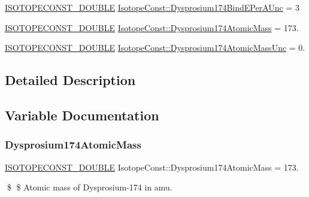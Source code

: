 \begin{DoxyCompactItemize}
\mbox{\hyperlink{group___isotope_const-_macros_ga8f45a7272ce02c0b4c65c44636ed719a}{I\+S\+O\+T\+O\+P\+E\+C\+O\+N\+S\+T\+\_\+\+D\+O\+U\+B\+LE}} \mbox{\hyperlink{group___isotope_const-_dysprosium-_dy174_ga437a1c4454ca5bb495819dc7f37ee754}{Isotope\+Const\+::\+Dysprosium174\+Bind\+E\+Per\+A\+Unc}} = 3
\item 
\mbox{\hyperlink{group___isotope_const-_macros_ga8f45a7272ce02c0b4c65c44636ed719a}{I\+S\+O\+T\+O\+P\+E\+C\+O\+N\+S\+T\+\_\+\+D\+O\+U\+B\+LE}} \mbox{\hyperlink{group___isotope_const-_dysprosium-_dy174_gaad1e92f03ab61709ef4eabfc6b90a978}{Isotope\+Const\+::\+Dysprosium174\+Atomic\+Mass}} = 173.
\item 
\mbox{\hyperlink{group___isotope_const-_macros_ga8f45a7272ce02c0b4c65c44636ed719a}{I\+S\+O\+T\+O\+P\+E\+C\+O\+N\+S\+T\+\_\+\+D\+O\+U\+B\+LE}} \mbox{\hyperlink{group___isotope_const-_dysprosium-_dy174_ga9c0c496436ec9e2d73db95ec7db4b5fb}{Isotope\+Const\+::\+Dysprosium174\+Atomic\+Mass\+Unc}} = 0.
\end{DoxyCompactItemize}


\subsection{Detailed Description}


\subsection{Variable Documentation}
\mbox{\label{group___isotope_const-_dysprosium-_dy174_gaad1e92f03ab61709ef4eabfc6b90a978}} 
\subsubsection{\texorpdfstring{Dysprosium174\+Atomic\+Mass}{Dysprosium174AtomicMass}}
{\footnotesize\ttfamily \mbox{\hyperlink{group___isotope_const-_macros_ga8f45a7272ce02c0b4c65c44636ed719a}{I\+S\+O\+T\+O\+P\+E\+C\+O\+N\+S\+T\+\_\+\+D\+O\+U\+B\+LE}} Isotope\+Const\+::\+Dysprosium174\+Atomic\+Mass = 173.}

\$ \$ Atomic mass of Dysprosium-\/174 in amu. \mbox{\label{group___isotope_const-_dysprosium-_dy174_ga9c0c496436ec9e2d73db95ec7db4b5fb}} 
